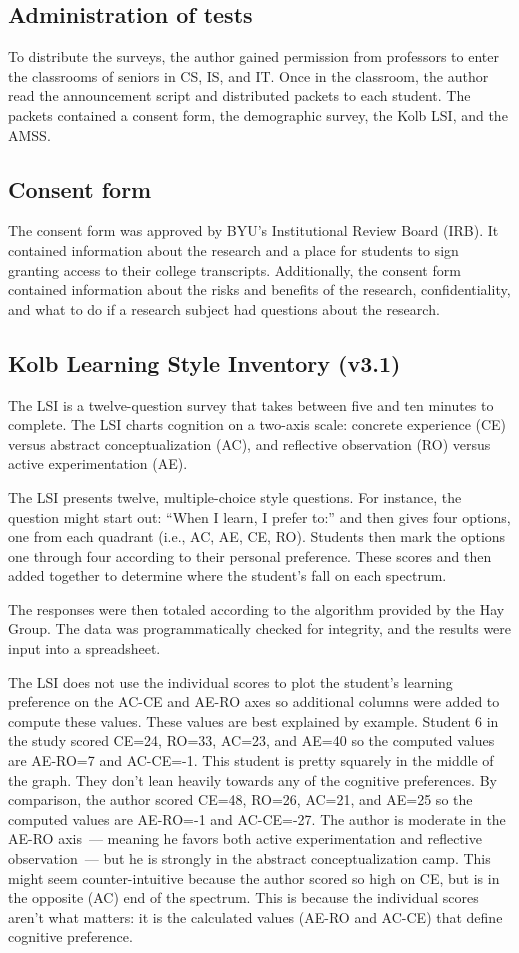 \subsection{Administration of tests}
To distribute the surveys, the author gained permission from professors to enter the classrooms of seniors in CS, IS, and IT. Once in the classroom, the author read the announcement script and distributed packets to each student. The packets contained a consent form, the demographic survey, the Kolb LSI, and the AMSS.

\subsection{Consent form}
The consent form was approved by BYU's Institutional Review Board (IRB). It contained information about the research and a place for students to sign granting access to their college transcripts. Additionally, the consent form contained information about the risks and benefits of the research, confidentiality, and what to do if a research subject had questions about the research.

\subsection{Kolb Learning Style Inventory (v3.1)}
The LSI is a twelve-question survey that takes between five and ten minutes to complete. The LSI charts cognition on a two-axis scale: concrete experience (CE) versus abstract conceptualization (AC), and reflective observation (RO) versus active experimentation (AE).

The LSI presents twelve, multiple-choice style questions. For instance, the question might start out: ``When I learn, I prefer to:'' and then gives four options, one from each quadrant (i.e., AC, AE, CE, RO). Students then mark the options one through four according to their personal preference. These scores and then added together to determine where the student's fall on each spectrum.

The responses were then totaled according to the algorithm provided by the Hay Group. The data was programmatically checked for integrity, and the results were input into a spreadsheet.

The LSI does not use the individual scores to plot the student's learning preference on the AC-CE and AE-RO axes so additional columns were added to compute these values. These values are best explained by example. Student 6 in the study scored CE=24, RO=33, AC=23, and AE=40 so the computed values are AE-RO=7 and AC-CE=-1. This student is pretty squarely in the middle of the graph. They don't lean heavily towards any of the cognitive preferences. By comparison, the author scored CE=48, RO=26, AC=21, and AE=25 so the computed values are AE-RO=-1 and AC-CE=-27. The author is moderate in the AE-RO axis~--- meaning he favors both active experimentation and reflective observation~--- but he is strongly in the abstract conceptualization camp. This might seem counter-intuitive because the author scored so high on CE, but is in the opposite (AC) end of the spectrum. This is because the individual scores aren't what matters: it is the calculated values (AE-RO and AC-CE) that define cognitive preference.

